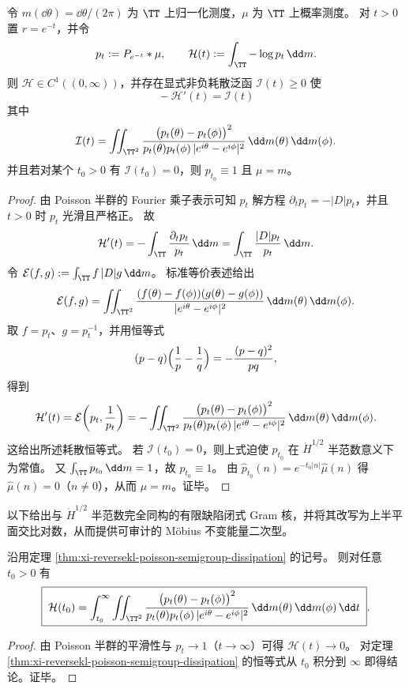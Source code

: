 \begin{theorem}\label{thm:xi-reversekl-poisson-semigroup-dissipation}
令 \(m(\dd\theta)=\dd\theta/(2\pi)\) 为 \(\TT\) 上归一化测度，\(\mu\) 为 \(\TT\) 上概率测度。
对 \(t>0\) 置 \(r=e^{-t}\)，并令
\[
p_t:=P_{e^{-t}}*\mu,\qquad
\mathcal H(t):=\int_{\TT}-\log p_t\,\dd m.
\]
则 \(\mathcal H\in C^1((0,\infty))\)，并存在显式非负耗散泛函 \(\mathcal I(t)\ge 0\) 使
\[
\boxed{\;-\mathcal H'(t)=\mathcal I(t)\;}
\]
其中
\[
\mathcal I(t)
=
\iint_{\TT^2}
\frac{\bigl(p_t(\theta)-p_t(\phi)\bigr)^2}
{p_t(\theta)p_t(\phi)\,|e^{i\theta}-e^{i\phi}|^2}\,\dd m(\theta)\,\dd m(\phi).
\]
并且若对某个 \(t_0>0\) 有 \(\mathcal I(t_0)=0\)，则 \(p_{t_0}\equiv 1\) 且 \(\mu=m\)。
\end{theorem}
\begin{proof}
由 Poisson 半群的 Fourier 乘子表示可知 \(p_t\) 解方程 \(\partial_t p_t=-|D|p_t\)，并且 \(t>0\) 时 \(p_t\) 光滑且严格正。
故
\[
\mathcal H'(t)
=-\int_{\TT}\frac{\partial_t p_t}{p_t}\,\dd m
=\int_{\TT}\frac{|D|p_t}{p_t}\,\dd m.
\]
令 \(\mathcal E(f,g):=\int_{\TT} f\,|D|g\,\dd m\)。
标准等价表述给出
\[
\mathcal E(f,g)
=\iint_{\TT^2}\frac{(f(\theta)-f(\phi))(g(\theta)-g(\phi))}{|e^{i\theta}-e^{i\phi}|^2}\,\dd m(\theta)\,\dd m(\phi).
\]
取 \(f=p_t\)、\(g=p_t^{-1}\)，并用恒等式
\[
(p-q)\Bigl(\frac1p-\frac1q\Bigr)=-\frac{(p-q)^2}{pq},
\]
得到
\[
\mathcal H'(t)
=\mathcal E\!\left(p_t,\frac1{p_t}\right)
=-\iint_{\TT^2}
\frac{\bigl(p_t(\theta)-p_t(\phi)\bigr)^2}{p_t(\theta)p_t(\phi)\,|e^{i\theta}-e^{i\phi}|^2}\,\dd m(\theta)\,\dd m(\phi).
\]
这给出所述耗散恒等式。
若 \(\mathcal I(t_0)=0\)，则上式迫使 \(p_{t_0}\) 在 \(\dot H^{1/2}\) 半范数意义下为常值。
又 \(\int_{\TT}p_{t_0}\,\dd m=1\)，故 \(p_{t_0}\equiv 1\)。
由 \(\widehat p_{t_0}(n)=e^{-t_0|n|}\widehat\mu(n)\) 得 \(\widehat\mu(n)=0\)（\(n\neq 0\)），从而 \(\mu=m\)。证毕。
\end{proof}

\par
以下给出与 \(\dot H^{1/2}\) 半范数完全同构的有限缺陷闭式 Gram 核，并将其改写为上半平面交比对数，从而提供可审计的 Möbius 不变能量二次型。


\begin{corollary}[反向相对熵的正项和积分表示]\label{cor:xi-reversekl-positive-integral-representation}
沿用定理 \ref{thm:xi-reversekl-poisson-semigroup-dissipation} 的记号。
则对任意 \(t_0>0\) 有
\[
\boxed{\;
\mathcal H(t_0)
=\int_{t_0}^{\infty}\iint_{\TT^2}
\frac{\bigl(p_t(\theta)-p_t(\phi)\bigr)^2}
{p_t(\theta)p_t(\phi)\,|e^{i\theta}-e^{i\phi}|^2}\,\dd m(\theta)\,\dd m(\phi)\,\dd t\; }.
\]
\end{corollary}
\begin{proof}
由 Poisson 半群的平滑性与 \(p_t\to 1\)（\(t\to\infty\)）可得 \(\mathcal H(t)\to 0\)。
对定理 \ref{thm:xi-reversekl-poisson-semigroup-dissipation} 的恒等式从 \(t_0\) 积分到 \(\infty\) 即得结论。证毕。
\end{proof}

